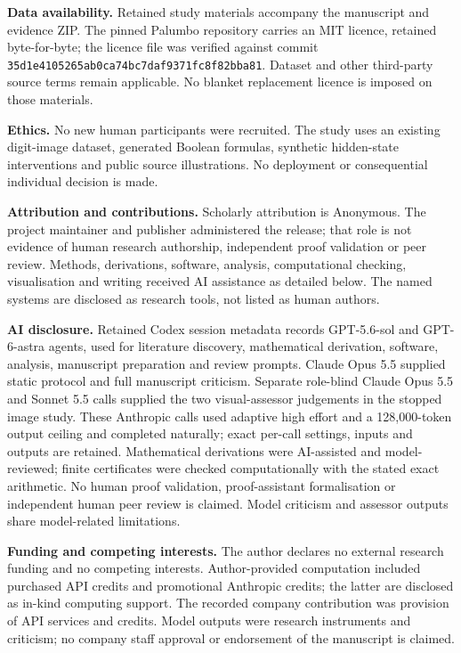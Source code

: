 \documentclass[
  british,
  11pt,
  a4paper,
]{article}
\begin{document}
\textbf{Data availability.} Retained study materials accompany the
manuscript and evidence ZIP. The pinned Palumbo repository carries an
MIT licence, retained byte-for-byte; the licence file was verified
against commit \texttt{35d1e4105265ab0ca74bc7daf9371fc8f82bba81}.
Dataset and other third-party source terms remain applicable. No blanket
replacement licence is imposed on those materials.

\textbf{Ethics.} No new human participants were recruited. The study
uses an existing digit-image dataset, generated Boolean formulas,
synthetic hidden-state interventions and public source illustrations. No
deployment or consequential individual decision is made.

\textbf{Attribution and contributions.} Scholarly attribution is
Anonymous. The project maintainer and publisher administered the
release; that role is not evidence of human research authorship,
independent proof validation or peer review. Methods, derivations,
software, analysis, computational checking, visualisation and writing
received AI assistance as detailed below. The named systems are
disclosed as research tools, not listed as human authors.

\textbf{AI disclosure.} Retained Codex session metadata records
GPT-5.6-sol and GPT-6-astra agents, used for literature discovery,
mathematical derivation, software, analysis, manuscript preparation and
review prompts. Claude Opus 5.5 supplied static protocol and full
manuscript criticism. Separate role-blind Claude Opus 5.5 and Sonnet 5.5
calls supplied the two visual-assessor judgements in the stopped image
study. These Anthropic calls used adaptive high effort and a
128,000-token output ceiling and completed naturally; exact per-call
settings, inputs and outputs are retained. Mathematical derivations were
AI-assisted and model-reviewed; finite certificates were checked
computationally with the stated exact arithmetic. No human proof
validation, proof-assistant formalisation or independent human peer
review is claimed. Model criticism and assessor outputs share
model-related limitations.

\textbf{Funding and competing interests.} The author declares no
external research funding and no competing interests. Author-provided
computation included purchased API credits and promotional Anthropic
credits; the latter are disclosed as in-kind computing support. The
recorded company contribution was provision of API services and credits.
Model outputs were research instruments and criticism; no company staff
approval or endorsement of the manuscript is claimed.
\end{document}
